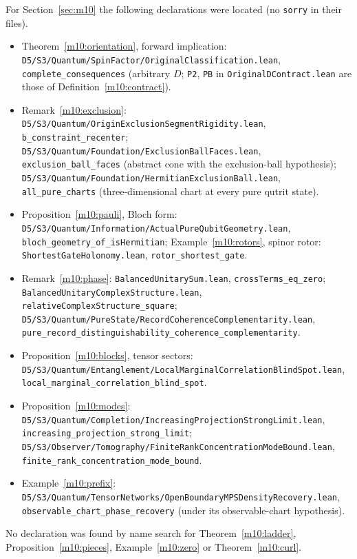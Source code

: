 \documentclass[11pt,reqno]{amsart}
\theoremstyle{definition}
\theoremstyle{remark}
\numberwithin{equation}{section}
\begin{document}
For Section~\ref{sec:m10} the following declarations were located (no \texttt{sorry} in their files).
{\small\raggedright
\begin{itemize}[leftmargin=1.5em]
\item Theorem~\ref{m10:orientation}, forward implication: \texttt{D5/S3/Quantum/SpinFactor/OriginalClassification.lean},
\texttt{complete\_consequences} (arbitrary $D$; \texttt{P2}, \texttt{PB} in \texttt{OriginalDContract.lean} are those of Definition~\ref{m10:contract}).
\item Remark~\ref{m10:exclusion}: \texttt{D5/S3/Quantum/OriginExclusionSegmentRigidity.lean}, \texttt{b\_constraint\_recenter};
\texttt{D5/S3/Quantum/Foundation/ExclusionBallFaces.lean}, \texttt{exclusion\_ball\_faces} (abstract cone with the exclusion-ball
hypothesis); \texttt{D5/S3/Quantum/Foundation/HermitianExclusionBall.lean}, \texttt{all\_pure\_charts} (three-dimensional chart at
every pure qutrit state).
\item Proposition~\ref{m10:pauli}, Bloch form: \texttt{D5/S3/Quantum/Information/ActualPureQubitGeometry.lean},
\texttt{bloch\_geometry\_of\_isHermitian}; Example~\ref{m10:rotors}, spinor rotor: \texttt{ShortestGateHolonomy.lean}, \texttt{rotor\_shortest\_gate}.
\item Remark~\ref{m10:phase}: \texttt{BalancedUnitarySum.lean}, \texttt{crossTerms\_eq\_zero}; \texttt{BalancedUnitaryComplexStructure.lean},
\texttt{relativeComplexStructure\_square}; \texttt{D5/S3/Quantum/PureState/RecordCoherenceComplementarity.lean},
\texttt{pure\_record\_distinguishability\_coherence\_complementarity}.
\item Proposition~\ref{m10:blocks}, tensor sectors: \texttt{D5/S3/Quantum/Entanglement/LocalMarginalCorrelationBlindSpot.lean},
\texttt{local\_marginal\_correlation\_blind\_spot}.
\item Proposition~\ref{m10:modes}: \texttt{D5/S3/Quantum/Completion/IncreasingProjectionStrongLimit.lean},
\texttt{increasing\_projection\_strong\_limit}; \texttt{D5/S3/Observer/Tomography/FiniteRankConcentrationModeBound.lean},
\texttt{finite\_rank\_concentration\_mode\_bound}.
\item Example~\ref{m10:prefix}: \texttt{D5/S3/Quantum/TensorNetworks/OpenBoundaryMPSDensityRecovery.lean},
\texttt{observable\_chart\_phase\_recovery} (under its observable-chart hypothesis).
\end{itemize}}
No declaration was found by name search for Theorem~\ref{m10:ladder}, Proposition~\ref{m10:pieces}, Example~\ref{m10:zero} or
Theorem~\ref{m10:curl}.
\end{document}
